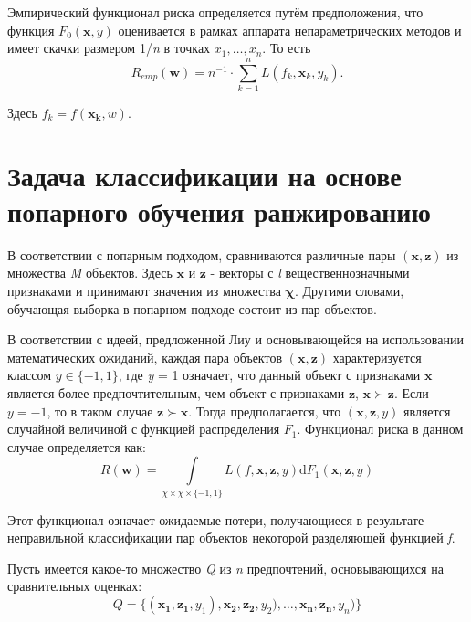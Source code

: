 \documentclass[12pt,a4paper,oneside]{article}
\begin{document}
\begin{multicols}{2}
\par
Эмпирический функционал риска определяется путём предположения, что функция \(F_0(\mathbf{x}, y)\) оценивается в рамках аппарата непараметрических методов  и имеет скачки размером 1/\emph{n} в точках \(x_1, \dots, x_n\). То есть
\[
R_{emp}(\mathbf{w}) = n^{-1} \cdot \sum \limits_{k=1}^n L(f_k, \mathbf{x}_k, y_k).
\]

Здесь \(f_k=f(\mathbf{x_k}, w)\). 


\vspace*{1em}
\chapter{Задача классификации на основе попарного обучения ранжированию}

\par
В соответствии с попарным подходом, сравниваются различные пары \((\mathbf{x},\mathbf{z})\) из множества \emph{M} объектов. 
Здесь \(\mathbf{x}\) и \(\mathbf{z}\) - векторы с \emph{l} вещественнозначными признаками и принимают значения из множества \(\mathbf{\chi}\). 
Другими словами, обучающая выборка в попарном подходе состоит из пар объектов. 

\par
В соответствии с идеей, предложенной Лиу  и основывающейся на использовании математических ожиданий, каждая пара объектов \((\mathbf{x}, \mathbf{z})\) характеризуется классом \(y \in \{-1,1\}\), где \emph{y} = 1 означает, что данный объект с признаками \(\mathbf{x}\) является более предпочтительным, чем объект с признаками \(\mathbf{z}\), \(\mathbf{x} \succ \mathbf{z}\). Если \(y = -1\), то в таком случае \(\mathbf{z} \succ \mathbf{x}\). Тогда предполагается, что \((\mathbf{x}, \mathbf{z}, y)\) является случайной величиной с функцией распределения \(F_1\). Функционал риска в данном случае определяется как:
\[
R(\mathbf{w}) = \int \limits_{\chi \times \chi \times \{-1, 1\}} L(f, \mathbf{x}, \mathbf{z}, y) \mathrm{d} F_1(\mathbf{x}, \mathbf{z}, y)
\]

\par

Этот функционал означает ожидаемые потери, получающиеся в результате неправильной классификации пар объектов некоторой разделяющей функцией \emph{f}. 

\par
Пусть имеется какое-то множество \emph{Q} из \emph{n} предпочтений, основывающихся на сравнительных оценках:
\[
Q = \{(\mathbf{x_1}, \mathbf{z_1}, y_1), \mathbf{x_2}, \mathbf{z_2}, y_2), \dots, \mathbf{x_n}, \mathbf{z_n}, y_n)\}
\]


\end{multicols}
\end{document}
